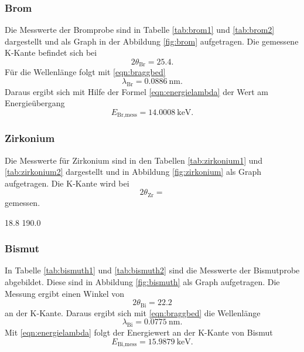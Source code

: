\subsubsection{Brom}

Die Messwerte der Bromprobe sind in Tabelle \ref{tab:brom1} und \ref{tab:brom2}
dargestellt und als
Graph in der Abbildung \ref{fig:brom} aufgetragen.
Die gemessene K-Kante befindet sich bei
\begin{equation}
  2\theta_\text{Br} = 25.4 .
\end{equation}
Für die Wellenlänge folgt mit \eqref{eqn:braggbed}
\begin{equation}
  \lambda_\text{Br} = \SI{0.0886}{\nano\meter}.
\end{equation}
Daraus ergibt sich mit Hilfe der Formel \eqref{eqn:energielambda}
der Wert am Energieübergang
\begin{equation}
  E_\text{Br,mess} = \SI{14.0008}{\kilo\electronvolt}.
\end{equation}

\subsubsection{Zirkonium}

Die Messwerte für Zirkonium sind in den Tabellen \ref{tab:zirkonium1} und
\ref{tab:zirkonium2} dargestellt und
in Abbildung \ref{fig:zirkonium} als Graph aufgetragen.
Die K-Kante wird bei
\begin{equation}
  2\theta_\text{Zr} =
\end{equation}
gemessen.

18.8  190.0


\subsubsection{Bismut}

In Tabelle \ref{tab:bismuth1} und \ref{tab:bismuth2} sind die Messwerte der
Bismutprobe abgebildet.
Diese sind in Abbildung \ref{fig:bismuth} als Graph aufgetragen.
Die Messung ergibt einen Winkel von
\begin{equation}
  2\theta_\text{Bi} = 22.2
\end{equation}
an der K-Kante.
Daraus ergibt sich mit \eqref{eqn:braggbed} die Wellenlänge
\begin{equation}
  \lambda_\text{Bi} = \SI{0.0775}{\nano\meter}.
\end{equation}
Mit \eqref{eqn:energielambda} folgt der Energiewert an der K-Kante von Bismut
\begin{equation}
  E_\text{Bi,mess} = \SI{15.9879}{\kilo\electronvolt}.
\end{equation}

